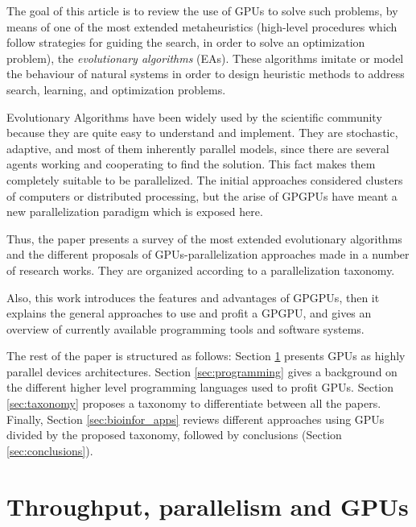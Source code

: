 \documentclass[Afour,sageh,times]{sagej}
\begin{document}
The goal of this article is to review the use of GPUs to solve such problems, by means of one of the most extended metaheuristics (high-level procedures which follow strategies for guiding the search, in order to solve an optimization problem), the \textit{evolutionary algorithms} (EAs). These algorithms imitate or model the behaviour of natural systems in order to design heuristic methods to address search, learning, and optimization problems.

Evolutionary Algorithms have been widely used by the scientific
community because they are quite easy to understand and
implement. They are stochastic, adaptive, and most of them inherently
parallel models, since there are several agents working and
cooperating to find the solution. This fact makes them completely
suitable to be parallelized. The initial approaches considered
clusters of computers or distributed processing, but the arise of
GPGPUs have meant a new parallelization paradigm which is exposed
here.

Thus, the paper presents a survey of the most extended evolutionary algorithms and the different proposals of GPUs-parallelization approaches made in a number of research works. They are organized according to a parallelization taxonomy.

Also, this work introduces the features and advantages of GPGPUs, then it explains the general approaches to use and profit a GPGPU, and gives an overview of currently available programming tools and software systems.

The rest of the paper is structured as follows: Section \ref{sec:parall_and_GPUs} presents GPUs as highly parallel devices architectures.
Section \ref{sec:programming} gives a background on the different
higher level programming languages used to profit GPUs. Section \ref{sec:taxonomy} proposes a taxonomy to differentiate between all the papers. %
Finally,
Section \ref{sec:bioinfor_apps} reviews different
approaches using GPUs divided by the proposed taxonomy, followed by conclusions (Section
\ref{sec:conclusions}). 

\section{Throughput, parallelism and GPUs}
\label{sec:parall_and_GPUs}
\end{document}
